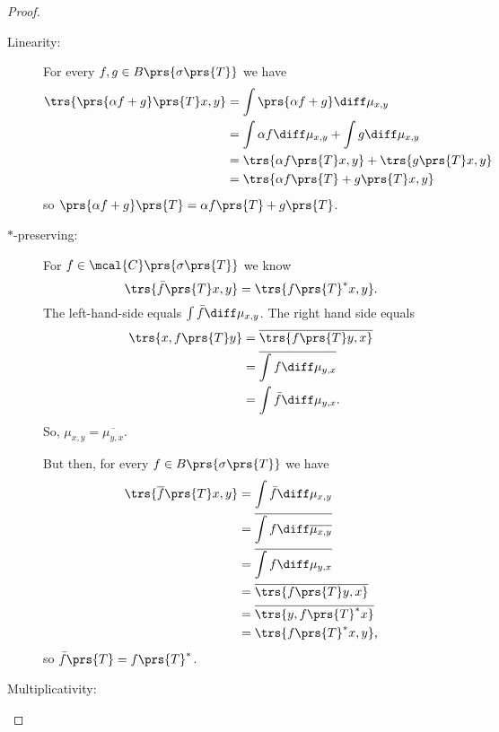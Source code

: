 \documentclass[10pt, twoside]{book}
\begin{document}
\begin{proof}
\begin{description}
\item[Linearity:]
For every $f,g \in B\prs{\sigma\prs{T}}$ we have
\begin{align*}
\trs{\prs{\alpha f+g}\prs{T} x, y} &= \int \prs{\alpha f+g} \diff \mu_{x,y}
\\&= \int \alpha f\diff \mu_{x,y} + \int g \diff\mu_{x,y}
\\&= \trs{\alpha f\prs{T} x, y} + \trs{g\prs{T} x, y}
\\&= \trs{\alpha f\prs{T} + g\prs{T}x, y}
\end{align*}
so $\prs{\alpha f + g}\prs{T} = \alpha f\prs{T} + g\prs{T}$.
\item[$*$-preserving:]
For $f \in \mcal{C}\prs{\sigma\prs{T}}$ we know
\[\trs{\bar{f}\prs{T} x , y} = \trs{f\prs{T}^*x, y} \text{.}\]
The left-hand-side equals $\int \bar{f} \diff \mu_{x,y}$.
The right hand side equals
\begin{align*}
\trs{x, f\prs{T} y} &= \overline{\trs{f\prs{T} y, x}}
\\&= \overline{\int f \diff \mu_{y,x}}
\\&= \int \bar{f} \diff \mu_{y,x} \text{.}
\end{align*}
So, $\mu_{x,y} = \overline{\mu_{y,x}}$.

But then, for every $f \in B\prs{\sigma\prs{T}}$ we have
\begin{align*}
\trs{\overline{f}\prs{T}x,y} &= \int \bar{f} \diff \mu_{x,y}
\\&= \overline{\int f \diff \overline{\mu_{x,y}}}
\\&= \overline{\int f \diff \mu_{y,x}}
\\&= \overline{\trs{f\prs{T} y, x}}
\\&= \overline{\trs{y, f\prs{T}^* x}}
\\&= \trs{f\prs{T}^* x , y} \text{,}
\end{align*}
so $\bar{f}\prs{T} = f\prs{T}^*$.

\item[Multiplicativity:]


\end{description}
\end{proof}
\end{document}
